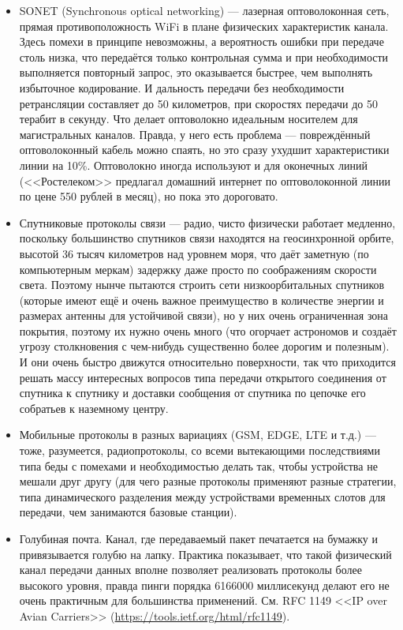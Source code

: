 \documentclass{../../text-style}
\begin{document}
\begin{itemize}
    \item SONET (Synchronous optical networking) --- лазерная оптоволоконная сеть, прямая противоположность WiFi в плане физических характеристик канала. Здесь помехи в принципе невозможны, а вероятность ошибки при передаче столь низка, что передаётся только контрольная сумма и при необходимости выполняется повторный запрос, это оказывается быстрее, чем выполнять избыточное кодирование. И дальность передачи без необходимости ретрансляции составляет до 50 километров, при скоростях передачи до 50 терабит в секунду. Что делает оптоволокно идеальным носителем для магистральных каналов. Правда, у него есть проблема --- повреждённый оптоволоконный кабель можно спаять, но это сразу ухудшит характеристики линии на 10\%. Оптоволокно иногда используют и для оконечных линий (<<Ростелеком>> предлагал домашний интернет по оптоволоконной линии по цене 550 рублей в месяц), но пока это дороговато.
    \item Спутниковые протоколы связи --- радио, чисто физически работает медленно, поскольку большинство спутников связи находятся на геосинхронной орбите, высотой 36 тысяч километров над уровнем моря, что даёт заметную (по компьютерным меркам) задержку даже просто по соображениям скорости света. Поэтому нынче пытаются строить сети низкоорбитальных спутников (которые имеют ещё и очень важное преимущество в количестве энергии и размерах антенны для устойчивой связи), но у них очень ограниченная зона покрытия, поэтому их нужно очень много (что огорчает астрономов и создаёт угрозу столкновения с чем-нибудь существенно более дорогим и полезным). И они очень быстро движутся относительно поверхности, так что приходится решать массу интересных вопросов типа передачи открытого соединения от спутника к спутнику и доставки сообщения от спутника по цепочке его собратьев к наземному центру.
    \item Мобильные протоколы в разных вариациях (GSM, EDGE, LTE и т.д.) --- тоже, разумеется, радиопротоколы, со всеми вытекающими последствиями типа беды с помехами и необходимостью делать так, чтобы устройства не мешали друг другу (для чего разные протоколы применяют разные стратегии, типа динамического разделения между устройствами временных слотов для передачи, чем занимаются базовые станции).
    \item Голубиная почта. Канал, где передаваемый пакет печатается на бумажку и привязывается голубю на лапку. Практика показывает, что такой физический канал передачи данных вполне позволяет реализовать протоколы более высокого уровня, правда пинги порядка 6166000 миллисекунд делают его не очень практичным для большинства применений. См. RFC 1149 <<IP over Avian Carriers>> (\url{https://tools.ietf.org/html/rfc1149}).
\end{itemize}
\end{document}
